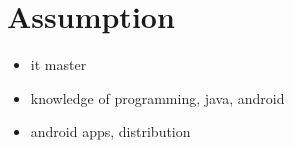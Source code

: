 \chapter{Assumption}
\begin{itemize}
  \item it master
  \item knowledge of programming, java, android
  \item android apps, distribution
\end{itemize}
